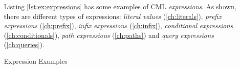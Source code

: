 Listing \ref{lst:ex:expressions} has some examples of CML \emph{expressions}.
As shown, there are different types of expressions:
\emph{literal values} (\ref{ch:literals}),
\emph{prefix expressions} (\ref{ch:prefix}),
\emph{infix expressions} (\ref{ch:infix}),
\emph{conditional expressions} (\ref{ch:conditionals}),
\emph{path expressions} (\ref{ch:paths})
and \emph{query expressions} (\ref{ch:queries}).

\begin{code}
\verbatimfont{\small}

\caption{Expression Examples}
\label{lst:ex:expressions}
\end{code}

